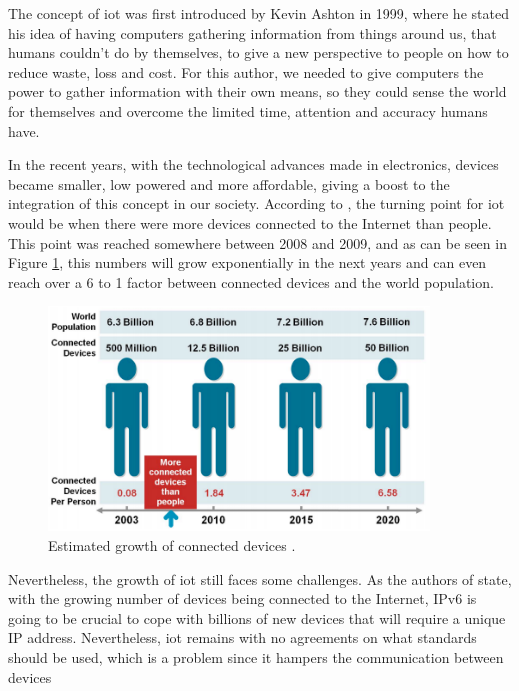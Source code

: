 The concept of \ac{iot} was first introduced by Kevin Ashton \cite{Ashton} in 1999, where he stated his idea of having computers gathering information from things around us, that humans couldn't do by themselves, to give a new perspective to people on how to reduce waste, loss and cost. For this author, we needed to give computers the power to gather information with their own means, so they could sense the world for themselves and overcome the limited time, attention and accuracy humans have.

In the recent years, with the technological advances made in electronics, devices became smaller, low powered and more affordable, giving a boost to the integration of this concept in our society. According to \cite{Evans2011}, the turning point for \ac{iot} would be when there were more devices connected to the Internet than people. This point was reached somewhere between 2008 and 2009, and as can be seen in Figure \ref{fig:iot_pic}, this numbers will grow exponentially in the next years and can even reach over a 6 to 1 factor between connected devices and the world population.

\begin{figure}[H]
	\centering
	\includegraphics[width=0.9\textwidth]{figures/iot_pic.png}
	\caption{Estimated growth of connected devices \cite{Evans2011}. }
	\label{fig:iot_pic}
\end{figure}

Nevertheless, the growth of \ac{iot} still faces some challenges. As the authors of \cite{Al-fuqaha2015} state, with the growing number of devices being connected to the Internet, IPv6 is going to be crucial to cope with billions of new devices that will require a unique IP address. Nevertheless, \ac{iot} remains with no agreements on what standards should be used, which is a problem since it hampers the communication between devices

